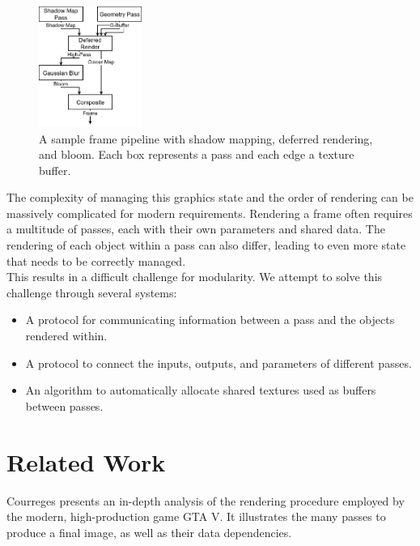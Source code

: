 \documentclass[format=sigconf]{acmart}
\begin{document}
\begin{figure}[h]
  \begin{center}
    \includegraphics[width=0.3\textwidth]{render-pipeline.png}
  \end{center}
  \caption{A sample frame pipeline with shadow mapping, deferred rendering, and bloom. Each box represents a pass and each edge a texture buffer.}
  \label{fig:render-pipeline}
\end{figure}

The complexity of managing this graphics state and the order of rendering can be massively complicated for modern requirements. Rendering a frame often requires a multitude of passes, each with their own parameters and shared data. The rendering of each object within a pass can also differ, leading to even more state that needs to be correctly managed. \\

This results in a difficult challenge for modularity. We attempt to solve this challenge through several systems:

\begin{itemize}
\item A protocol for communicating information between a pass and the objects rendered within.
\item A protocol to connect the inputs, outputs, and parameters of different passes.
\item An algorithm to automatically allocate shared textures used as buffers between passes.
\end{itemize}

\section{Related Work}\label{relatedwork}
Courreges\cite{gtav} presents an in-depth analysis of the rendering procedure employed by the modern, high-production game GTA V. It illustrates the many passes to produce a final image, as well as their data dependencies. \\
\end{document}
